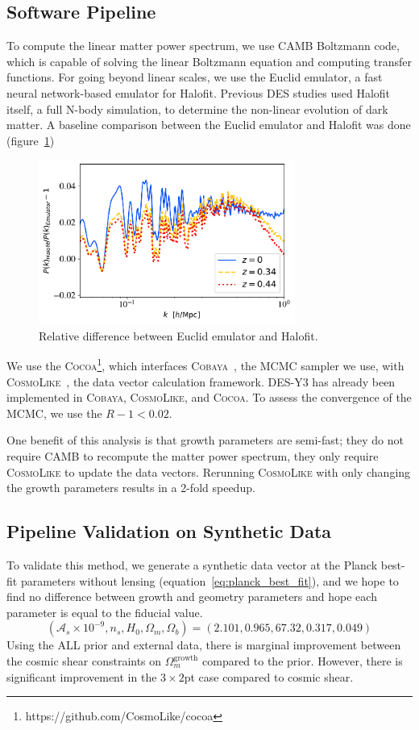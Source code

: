 \subsection{Software Pipeline}
To compute the linear matter power spectrum, we use \textsc{CAMB} Boltzmann code, which is capable of solving the linear Boltzmann equation and computing transfer functions. For going beyond linear scales, we use the Euclid emulator, a fast neural network-based emulator for Halofit. Previous DES studies used Halofit itself, a full N-body simulation, to determine the non-linear evolution of dark matter. A baseline comparison between the Euclid emulator and Halofit was done (figure~\ref{fig:euc_v_halo})
\begin{figure}[ht]
	\centering
	\includegraphics[width=0.75\textwidth]{plots/halo_vs_emu.pdf}
	\caption{Relative difference between Euclid emulator and Halofit.}
	\label{fig:euc_v_halo}
\end{figure}
We use the \textsc{Cocoa}\footnote{https://github.com/CosmoLike/cocoa}, which interfaces \textsc{Cobaya}~\cite{cobaya}, the MCMC sampler we use, with \textsc{CosmoLike}~\cite{cosmolike}, the data vector calculation framework. DES-Y3 has already been implemented in \textsc{Cobaya}, \textsc{CosmoLike}, and \textsc{Cocoa}. To assess the convergence of the MCMC, we use the $R-1<0.02$.

One benefit of this analysis is that growth parameters are semi-fast; they do not require \textsc{CAMB} to recompute the matter power spectrum, they only require \textsc{CosmoLike} to update the data vectors. Rerunning \textsc{CosmoLike} with only changing the growth parameters results in a 2-fold speedup.
\subsection{Pipeline Validation on Synthetic Data}
To validate this method, we generate a synthetic data vector at the Planck best-fit parameters without lensing (equation~\ref{eq:planck_best_fit}), and we hope to find no difference between growth and geometry parameters and hope each parameter is equal to the fiducial value.
\begin{equation}\label{eq:planck_best_fit}
	(\mathcal{A}_s\times10^{-9}, n_s, H_0, \Omega_m, \Omega_b) = (2.101,0.965,67.32,0.317,0.049)
\end{equation}
Using the ALL prior and external data, there is marginal improvement between the cosmic shear constraints on $\Omega_m^\mathrm{growth}$ compared to the prior. However, there is significant improvement in the $3\times2$pt case compared to cosmic shear. 

